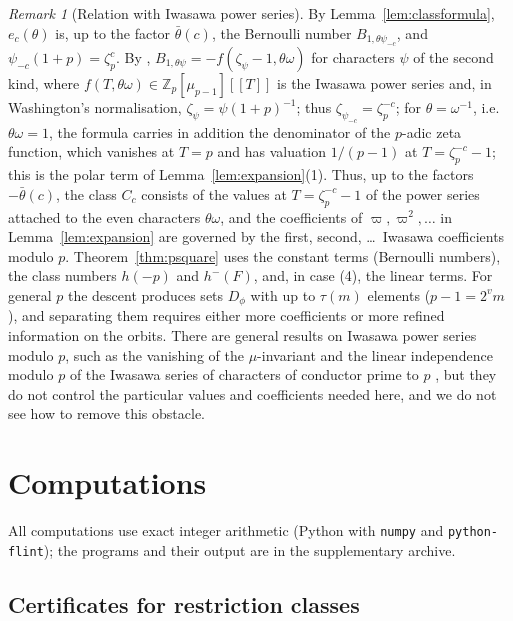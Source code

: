 \documentclass[11pt]{amsart}
\theoremstyle{definition}
\theoremstyle{remark}
\newtheorem{remark}[theorem]{Remark}
\providecommand{\Z}{\mathbb Z}
\numberwithin{equation}{section}
\begin{document}
\begin{remark}[Relation with Iwasawa power series]\label{rem:iwasawa}
By Lemma~\ref{lem:classformula}, $e_c(\theta)$ is, up to the factor $\bar\theta(c)$, the Bernoulli number $B_{1,\theta\psi_{-c}}$, and $\psi_{-c}(1+p)=\zeta_p^{c}$.
By \cite[Theorem~7.10]{Was97}, $B_{1,\theta\psi}=-f(\zeta_\psi-1,\theta\omega)$ for characters $\psi$ of the second kind, where $f(T,\theta\omega)\in\Z_p[\mu_{p-1}][[T]]$ is the Iwasawa power series and, in Washington's normalisation, $\zeta_\psi=\psi(1+p)^{-1}$; thus $\zeta_{\psi_{-c}}=\zeta_p^{-c}$; for $\theta=\omega^{-1}$, i.e.\ $\theta\omega=1$, the formula carries in addition the denominator of the $p$-adic zeta function, which vanishes at $T=p$ and has valuation $1/(p-1)$ at $T=\zeta_p^{-c}-1$; this is the polar term of Lemma~\ref{lem:expansion}(1).
Thus, up to the factors $-\bar\theta(c)$, the class $C_c$ consists of the values at $T=\zeta_p^{-c}-1$ of the power series attached to the even characters $\theta\omega$, and the coefficients of $\varpi,\varpi^2,\dots$ in Lemma~\ref{lem:expansion} are governed by the first, second, \dots\ Iwasawa coefficients modulo $p$.
Theorem~\ref{thm:psquare} uses the constant terms (Bernoulli numbers), the class numbers $h(-p)$ and $h^-(F)$, and, in case (4), the linear terms.
For general $p$ the descent produces sets $D_\phi$ with up to $\tau(m)$ elements ($p-1=2^vm$), and separating them requires either more coefficients or more refined information on the orbits. There are general results on Iwasawa power series modulo $p$, such as the vanishing of the $\mu$-invariant \cite{FW79} and the linear independence modulo $p$ of the Iwasawa series of characters of conductor prime to $p$ \cite{AR10}, but they do not control the particular values and coefficients needed here, and we do not see how to remove this obstacle.
\end{remark}
\section{Computations}\label{sec:comp}

All computations use exact integer arithmetic (Python with \texttt{numpy} and \texttt{python-flint}); the programs and their output are in the supplementary archive.

\subsection{Certificates for restriction classes}
\end{document}
